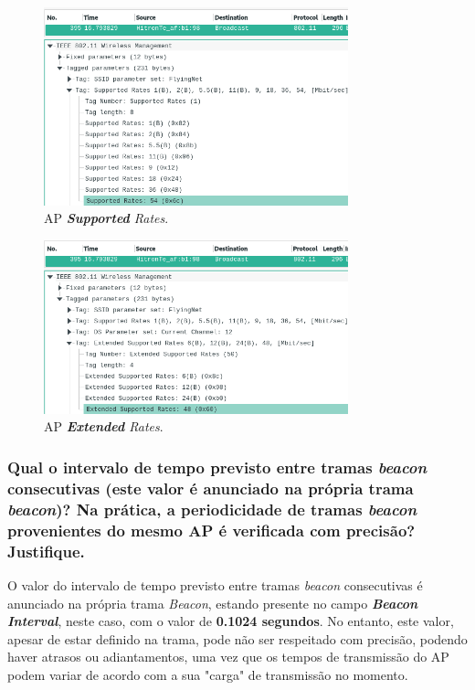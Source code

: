     
    \begin{figure}[H]
    \centering
    \includegraphics[width=250pt]{Prints/Questao5/questao5-VariousRates.png}
    \caption{AP \textit{\textbf{Supported} Rates}.} \label{questao5-SuppRates}
    \end{figure}

    \begin{figure}[H]
    \centering
    \includegraphics[width=250pt]{Prints/Questao5/questao5-VariousRates-Extended.png}
    \caption{AP \textit{\textbf{Extended} Rates}.} \label{questao5-ExtRates}
    \end{figure}
        
        





\subsubsection{Qual o intervalo de tempo previsto entre tramas \textit{beacon} consecutivas (este valor é anunciado na própria trama \textit{beacon})? Na prática, a periodicidade de tramas \textit{beacon} provenientes do mesmo AP é verificada com precisão? Justifique.}

    \par O valor do intervalo de tempo previsto entre tramas \textit{beacon} consecutivas é anunciado na própria trama \textit{Beacon}, estando presente no campo \textit{\textbf{Beacon Interval}}, neste caso, com o valor de \textbf{0.1024 segundos}. No entanto, este valor, apesar de estar definido na trama, pode não ser respeitado com precisão, podendo haver atrasos ou adiantamentos, uma vez que os tempos de transmissão do AP podem variar de acordo com a sua "carga"\xspace de transmissão no momento.
    
